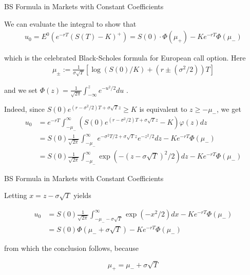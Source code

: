 \documentclass{beamer}
\begin{document}
\begin{frame}{BS Formula in Markets with Constant Coefficients}

    {\footnotesize \footnotesize
    \par We can evaluate the integral to show that
    \begin{align*}
        u_0 = E^0 \left( e^{-rT} (S(T) - K)^+ \right) = S(0) \cdot \Phi(\mu_+) - Ke^{-rT} \Phi(\mu_-)
    \end{align*}
    \par which is the celebrated Black-Scholes formula for European call option. Here
    \begin{align*}
        \mu_{\pm} := \frac{1}{\sigma\sqrt{T}} [\log(S(0)/K) + (r \pm (\sigma^2/2))T]
    \end{align*}
    \par and we set \( \Phi(z) = \frac{1}{\sqrt{2\pi}} \int_{-\infty}^{z} e^{-u^2/2} du \) .
    \par Indeed, since \( S(0)e^{(r-\sigma^2/2)T+\sigma\sqrt{T}z} \geq K \) is equivalent to \( z \geq -\mu_- \), we get
    \begin{align*}
    u_0 &= e^{-rT} \int_{-\mu_-}^{\infty} \left( S(0)e^{(r-\sigma^2/2)T+\sigma\sqrt{T}z} - K \right) \varphi(z) dz \\
    &= S(0) \frac{1}{\sqrt{2\pi}} \int_{-\mu_-}^{\infty} e^{-\sigma^2T/2+\sigma\sqrt{T}z} e^{-z^2/2} dz - Ke^{-rT} \Phi(\mu_-) \\
    &= S(0) \frac{1}{\sqrt{2\pi}} \int_{-\mu_-}^{\infty} \exp \left( - \left( z - \sigma\sqrt{T} \right)^2 / 2 \right) dz - Ke^{-rT} \Phi(\mu_-)
\end{align*}
    }
    
\end{frame}



\begin{frame}{BS Formula in Markets with Constant Coefficients}

    {\footnotesize \footnotesize
    \par Letting \( x = z - \sigma\sqrt{T} \) yields

    \begin{align*}
    u_0 &= S(0) \frac{1}{\sqrt{2\pi}} \int_{-\mu_- - \sigma\sqrt{T}}^{\infty} \exp \left( -x^2 / 2 \right) dx - Ke^{-rT} \Phi(\mu_-) \\
    &= S(0) \Phi \left( \mu_- + \sigma\sqrt{T} \right) - Ke^{-rT} \Phi(\mu_-)
    \end{align*}

    \par from which the conclusion follows, because

\[\mu_+ = \mu_- + \sigma\sqrt{T}\]
    }
    
\end{frame}


    
\end{document}
